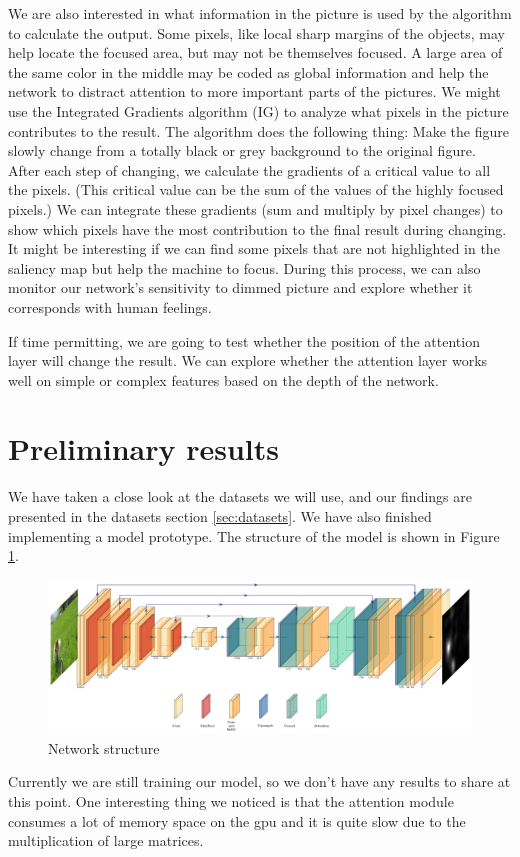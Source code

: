 \documentclass[12pt]{article}
\begin{document}
We are also interested in what information in the picture is used by the algorithm to calculate the output. Some pixels, like local sharp margins of the objects, may help locate the focused area, but may not be themselves focused. A large area of the same color in the middle may be coded as global information and help the network to distract attention to more important parts of the pictures.
We might use the Integrated Gradients algorithm (IG) \cite{sundararajan2017axiomatic} to analyze what pixels in the picture contributes to the result. The algorithm does the following thing: Make the figure slowly change from a totally black or grey background to the original figure.
After each step of changing, we calculate the gradients of a critical value to all the pixels. (This critical value can be the sum of the values of the highly focused pixels.) We can integrate these gradients (sum and multiply by pixel changes) to show which pixels have the most contribution to the final result during changing.
It might be interesting if we can find some pixels that are not highlighted in the saliency map but help the machine to focus.
During this process, we can also monitor our network's sensitivity to dimmed picture and explore whether it corresponds with human feelings.

If time permitting, we are going to test whether the position of the attention layer will change the result. We can explore whether the attention layer works well on simple or complex features based on the depth of the network.

\section{Preliminary results}
We have taken a close look at the datasets we will use, and our findings are presented
in the datasets section \ref{sec:datasets}. We have also finished implementing a model prototype.
The structure of the model is shown in Figure \ref{img:network}.
\begin{figure}[!h]
    \centering
    \includegraphics[width=7in]{imgs/network.pdf}
    \caption{Network structure}
    \label{img:network}
\end{figure}
Currently we are still training our model, so we don't have any results to share at this point.
One interesting thing we noticed is that the attention module consumes a lot of memory space
on the gpu and it is quite slow due to the multiplication of large matrices.
\end{document}
